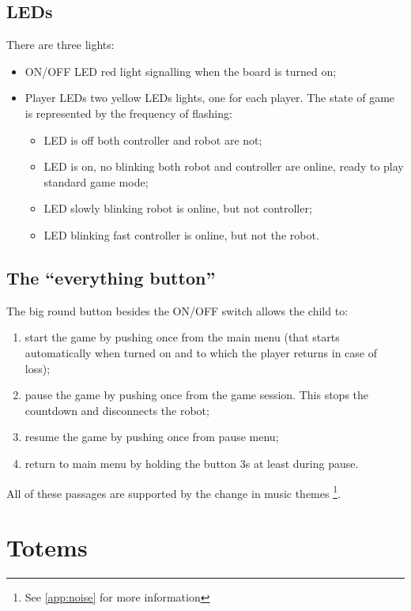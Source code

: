 \documentclass[a4paper,twoside]{book}
\begin{document}
\subsection{LEDs}

\beforelist There are three lights:
\begin{itemize}
\item ON/OFF LED \textemdash red light signalling when the board is turned on;
\item Player LEDs \textemdash two yellow LEDs lights, one for each player. The state of game is represented by the frequency of flashing:
  \begin{itemize}
  \item LED is off \textemdash both controller and robot are not;
  \item LED is on, no blinking \textemdash both robot and controller are online, ready to play standard game mode;
  \item LED slowly blinking \textemdash robot is online, but not controller;
  \item LED blinking fast \textemdash controller is online, but not the robot.
  \end{itemize}
\end{itemize}
\afterlist*

\subsection{The \textquotedblleft everything button\textquotedblright}

\beforelist The big round button besides the ON/OFF switch allows the child to:
\begin{enumerate}
\item start the game \textemdash by pushing once from the main menu (that starts automatically when turned on and to which the player returns in case of loss);
\item pause the game \textemdash by pushing once from the game session. This stops the countdown and disconnects the robot;
\item resume the game \textemdash by pushing once from pause menu;
\item return to main menu \textemdash by holding the button 3s at least during pause.
\end{enumerate}
\afterlist
All of these passages are supported by the change in music themes 
\footnote {See \autoref{app:noise} for more information}.


\section{Totems}
\end{document}
